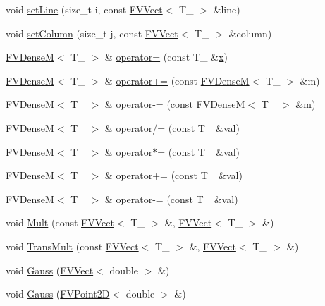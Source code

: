 \begin{DoxyCompactItemize}
\item 
void \hyperlink{classFVDenseM_a9441579962fe169d09d5fd504388da1a}{setLine} (size\_\-t i, const \hyperlink{classFVVect}{FVVect}$<$ T\_\- $>$ \&line)
\item 
void \hyperlink{classFVDenseM_a888ffa88e606f11b989361ef3b1176b6}{setColumn} (size\_\-t j, const \hyperlink{classFVVect}{FVVect}$<$ T\_\- $>$ \&column)
\item 
\hyperlink{classFVDenseM}{FVDenseM}$<$ T\_\- $>$ \& \hyperlink{classFVDenseM_a06daa883e8e99590868bfd95689d638b}{operator=} (const T\_\- \&\hyperlink{FVL_2FVPoint2D_8h_a9a4f74af87a76a4c3dcb729cb0e68f8d}{x})
\item 
\hyperlink{classFVDenseM}{FVDenseM}$<$ T\_\- $>$ \& \hyperlink{classFVDenseM_a1beab84f76baeed61a89633796b6cc29}{operator+=} (const \hyperlink{classFVDenseM}{FVDenseM}$<$ T\_\- $>$ \&m)
\item 
\hyperlink{classFVDenseM}{FVDenseM}$<$ T\_\- $>$ \& \hyperlink{classFVDenseM_afb8664e2aaa7a8897ee8aef014a494da}{operator-\/=} (const \hyperlink{classFVDenseM}{FVDenseM}$<$ T\_\- $>$ \&m)
\item 
\hyperlink{classFVDenseM}{FVDenseM}$<$ T\_\- $>$ \& \hyperlink{classFVDenseM_aa5ac6333bf08dddc27d45d6f7ddb79c9}{operator/=} (const T\_\- \&val)
\item 
\hyperlink{classFVDenseM}{FVDenseM}$<$ T\_\- $>$ \& \hyperlink{classFVDenseM_ac8084800d4aa148e541d0b00412180df}{operator$\ast$=} (const T\_\- \&val)
\item 
\hyperlink{classFVDenseM}{FVDenseM}$<$ T\_\- $>$ \& \hyperlink{classFVDenseM_aaf2cfed3edf8bd21a0830ddf20c61462}{operator+=} (const T\_\- \&val)
\item 
\hyperlink{classFVDenseM}{FVDenseM}$<$ T\_\- $>$ \& \hyperlink{classFVDenseM_ad8aa01530a594eb81c92744755f07a4e}{operator-\/=} (const T\_\- \&val)
\item 
void \hyperlink{classFVDenseM_a75a2ced8980671cf0a67b6fdd5ededb5}{Mult} (const \hyperlink{classFVVect}{FVVect}$<$ T\_\- $>$ \&, \hyperlink{classFVVect}{FVVect}$<$ T\_\- $>$ \&)
\item 
void \hyperlink{classFVDenseM_a51effb20cd7b29168e5f8eb0a96067a0}{TransMult} (const \hyperlink{classFVVect}{FVVect}$<$ T\_\- $>$ \&, \hyperlink{classFVVect}{FVVect}$<$ T\_\- $>$ \&)
\item 
void \hyperlink{classFVDenseM_aea5f8e6172b2bc847ebe020b047508f6}{Gauss} (\hyperlink{classFVVect}{FVVect}$<$ double $>$ \&)
\item 
void \hyperlink{classFVDenseM_a24fe34cc0ea853e2b1db3a67af13a7d8}{Gauss} (\hyperlink{classFVPoint2D}{FVPoint2D}$<$ double $>$ \&)

\end{DoxyCompactItemize}
